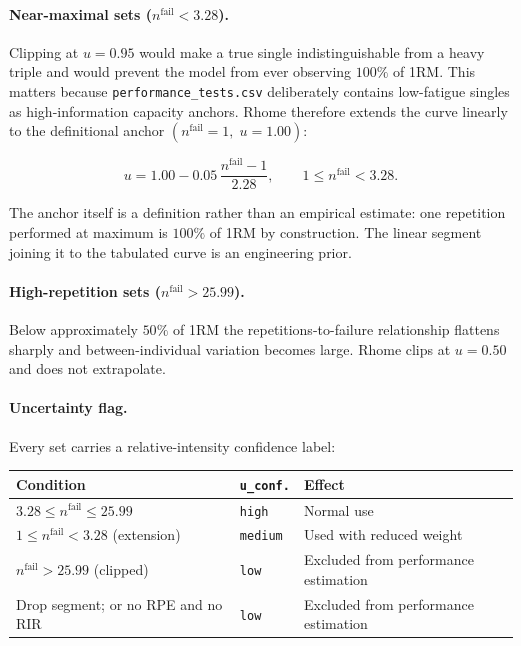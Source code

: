 \documentclass[11pt]{article}
\begin{document}
\paragraph{Near-maximal sets ($n^{\mathrm{fail}}<3.28$).}
Clipping at $u=0.95$ would make a true single indistinguishable from a heavy triple and would prevent the model from ever observing $100\%$ of 1RM. This matters because \texttt{performance\_tests.csv} deliberately contains low-fatigue singles as high-information capacity anchors. Rhome therefore extends the curve linearly to the definitional anchor $(n^{\mathrm{fail}}=1,\;u=1.00)$:

\begin{equation}
u = 1.00 - 0.05\,\frac{n^{\mathrm{fail}}-1}{2.28},
\qquad 1\le n^{\mathrm{fail}}<3.28.
\end{equation}

The anchor itself is a definition rather than an empirical estimate: one repetition performed at maximum is $100\%$ of 1RM by construction. The linear segment joining it to the tabulated curve is an engineering prior.

\paragraph{High-repetition sets ($n^{\mathrm{fail}}>25.99$).}
Below approximately $50\%$ of 1RM the repetitions-to-failure relationship flattens sharply and between-individual variation becomes large. Rhome clips at $u=0.50$ and does not extrapolate.

\paragraph{Uncertainty flag.}
Every set carries a relative-intensity confidence label:

\begin{center}
\begin{tabular}{llp{}}
\toprule
Condition & \texttt{u\_conf.} & Effect \\
\midrule
$3.28\le n^{\mathrm{fail}}\le 25.99$ & \texttt{high} & Normal use \\
$1\le n^{\mathrm{fail}}<3.28$ (extension) & \texttt{medium} & Used with reduced weight \\
$n^{\mathrm{fail}}>25.99$ (clipped) & \texttt{low} & Excluded from performance estimation \\
Drop segment; or no RPE and no RIR & \texttt{low} & Excluded from performance estimation \\
\bottomrule
\end{tabular}
\end{center}
\end{document}
